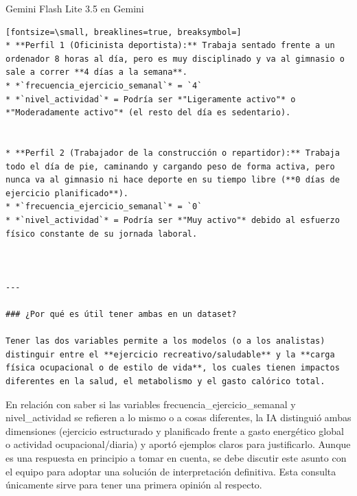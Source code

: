 \documentclass[12pt,a4paper,oneside]{book}
\begin{document}
\begin{iaresp}{Gemini Flash Lite 3.5 en Gemini}
\begin{Verbatim}[fontsize=\small, breaklines=true, breaksymbol=]
* **Perfil 1 (Oficinista deportista):** Trabaja sentado frente a un ordenador 8 horas al día, pero es muy disciplinado y va al gimnasio o sale a correr **4 días a la semana**.
* *`frecuencia_ejercicio_semanal`* = `4`
* *`nivel_actividad`* = Podría ser *"Ligeramente activo"* o *"Moderadamente activo"* (el resto del día es sedentario).


* **Perfil 2 (Trabajador de la construcción o repartidor):** Trabaja todo el día de pie, caminando y cargando peso de forma activa, pero nunca va al gimnasio ni hace deporte en su tiempo libre (**0 días de ejercicio planificado**).
* *`frecuencia_ejercicio_semanal`* = `0`
* *`nivel_actividad`* = Podría ser *"Muy activo"* debido al esfuerzo físico constante de su jornada laboral.



---

### ¿Por qué es útil tener ambas en un dataset?

Tener las dos variables permite a los modelos (o a los analistas) distinguir entre el **ejercicio recreativo/saludable** y la **carga física ocupacional o de estilo de vida**, los cuales tienen impactos diferentes en la salud, el metabolismo y el gasto calórico total.
\end{Verbatim}
\end{iaresp}
\begin{iaanalisis}
En relación con saber si las variables frecuencia\_ejercicio\_semanal y nivel\_actividad se refieren a lo mismo o a cosas diferentes, la IA distinguió ambas dimensiones (ejercicio estructurado y planificado frente a gasto energético global o actividad ocupacional/diaria) y aportó ejemplos claros para justificarlo. Aunque es una respuesta en principio a tomar en cuenta, se debe discutir este asunto con el equipo para adoptar una solución de interpretación definitiva. Esta consulta únicamente sirve para tener una primera opinión al respecto.
\end{iaanalisis}
\end{document}
